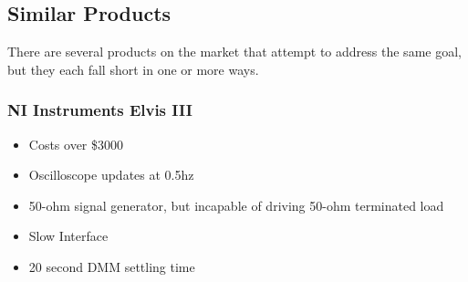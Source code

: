 \subsection{Similar Products}
	There are several products on the market that attempt to address the same goal, but they each fall short in one or more ways.
	\subsubsection{NI Instruments Elvis III}
		\begin{itemize}
			\item Costs over \$3000
			\item Oscilloscope updates at 0.5hz
			\item 50-ohm signal generator, but incapable of driving 50-ohm terminated load
			\item Slow Interface
			\item 20 second DMM settling time
		\end{itemize}